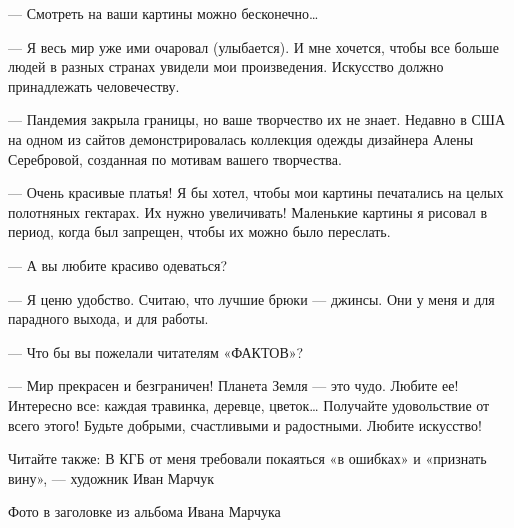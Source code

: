 --- Смотреть на ваши картины можно бесконечно…

--- Я весь мир уже ими очаровал (улыбается). И мне хочется, чтобы все больше
людей в разных странах увидели мои произведения. Искусство должно
принадлежать человечеству.

--- Пандемия закрыла границы, но ваше творчество их не знает. Недавно в США
на одном из сайтов демонстрировалась коллекция одежды дизайнера Алены
Серебровой, созданная по мотивам вашего творчества.

--- Очень красивые платья! Я бы хотел, чтобы мои картины печатались на целых
полотняных гектарах. Их нужно увеличивать! Маленькие картины я рисовал
в период, когда был запрещен, чтобы их можно было переслать.

--- А вы любите красиво одеваться?

--- Я ценю удобство. Считаю, что лучшие брюки --- джинсы. Они у меня и для
парадного выхода, и для работы.

--- Что бы вы пожелали читателям «ФАКТОВ»?

--- Мир прекрасен и безграничен! Планета Земля --- это чудо. Любите ее!
Интересно все: каждая травинка, деревце, цветок… Получайте удовольствие
от всего этого! Будьте добрыми, счастливыми и радостными. Любите
искусство!

Читайте также: В КГБ от меня требовали покаяться «в ошибках» и «признать
вину», --- художник Иван Марчук

Фото в заголовке из альбома Ивана Марчука


